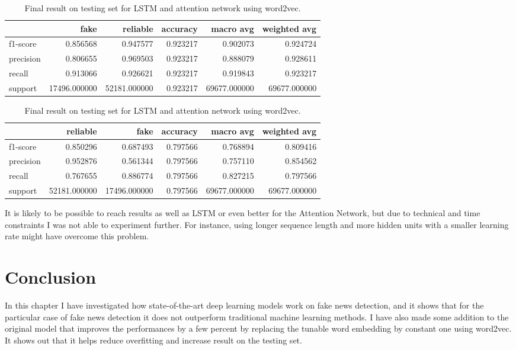 \begin{table}
 \begin{subtable}{\textwidth}
  \begin{tabular}{lrrrrr}
  \toprule
  {} &          fake &      reliable &  accuracy &     macro avg &  weighted avg \\
  \midrule
  f1-score  &      0.856568 &      0.947577 &  0.923217 &      0.902073 &      0.924724 \\
  precision &      0.806655 &      0.969503 &  0.923217 &      0.888079 &      0.928611 \\
  recall    &      0.913066 &      0.926621 &  0.923217 &      0.919843 &      0.923217 \\
  support   &  17496.000000 &  52181.000000 &  0.923217 &  69677.000000 &  69677.000000 \\
  \bottomrule
  \end{tabular}
  \caption{LSTM + word2vec results on \textbf{Fake News Corpus}}
 \end{subtable}
 \begin{subtable}{\textwidth}
  \begin{tabular}{lrrrrr}
  \toprule
  {} &      reliable &          fake &  accuracy &     macro avg &  weighted avg \\
  \midrule
  f1-score  &      0.850296 &      0.687493 &  0.797566 &      0.768894 &      0.809416 \\
  precision &      0.952876 &      0.561344 &  0.797566 &      0.757110 &      0.854562 \\
  recall    &      0.767655 &      0.886774 &  0.797566 &      0.827215 &      0.797566 \\
  support   &  52181.000000 &  17496.000000 &  0.797566 &  69677.000000 &  69677.000000 \\
  \bottomrule
  \end{tabular}
  \caption{Attention Network + word2vec on \textbf{Fake News Corpus}}
 \end{subtable}
 \caption{Final result on testing set for LSTM and attention network using word2vec.}
 \label{table:chap4:results2}
\end{table}
It is likely to be possible to reach results as well as LSTM or even better for the Attention Network, but due to technical and time constraints I was not able to experiment further. For instance, using longer sequence length and more hidden units with a smaller learning rate might have overcome this problem. 
\section{Conclusion}
In this chapter I have investigated how state-of-the-art deep learning models work on fake news detection, and it shows that for the particular case of fake news detection it does not outperform traditional machine learning methods. I have also made some addition to the original model that improves the performances by a few percent by replacing the tunable word embedding by constant one using word2vec. It shows out that it helps reduce overfitting and increase result on the testing set. \\

